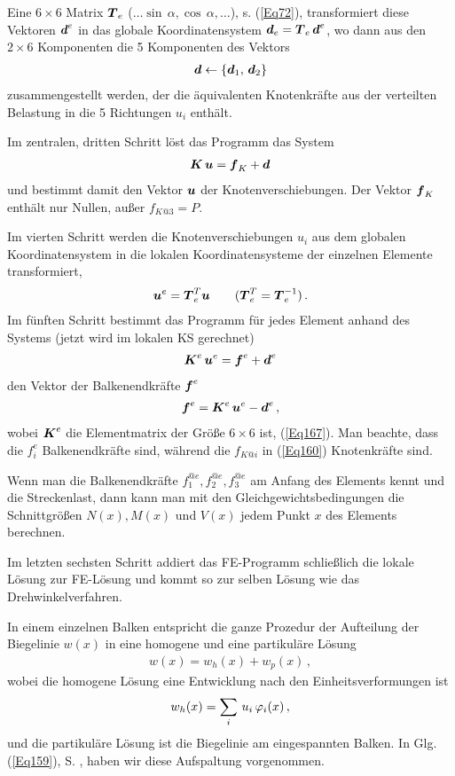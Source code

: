 Eine $6 \times 6$ Matrix $\mbox{\boldmath $T$}_e$ ($\ldots \sin\,\alpha, \cos\,\alpha, \ldots$), s. (\ref{Eq72}), transformiert diese Vektoren $\mbox{\boldmath $d$}^e$ in das globale Koordinatensystem $\mbox{\boldmath $d$}_e = \mbox{\boldmath $T$}_e\,\mbox{\boldmath $d$}^e$, wo dann aus den $2 \times 6$ Komponenten die 5 Komponenten des Vektors
\begin{align}
\mbox{\boldmath $d$}\leftarrow \{\mbox{\boldmath $d$}_1,\, \mbox{\boldmath $d$}_2\}
\end{align}
zusammengestellt werden, der die \"{a}quivalenten Knotenkr\"{a}fte aus der verteilten Belastung in die 5 Richtungen $u_i$ enth\"{a}lt.

Im zentralen, dritten Schritt l\"{o}st das Programm das System
\begin{align}\label{Eq160}
\mbox{\boldmath $K$}\,\mbox{\boldmath $u$} = \mbox{\boldmath $f$}_K + \mbox{\boldmath $d$}
\end{align}
und bestimmt damit den Vektor $\mbox{\boldmath $u$}$ der Knotenverschiebungen. Der Vektor $\mbox{\boldmath $f$}_K$ enth\"{a}lt nur Nullen, au{\ss}er $f_{K @3} = P$.

Im vierten Schritt werden die Knotenverschiebungen $u_i$ aus dem globalen Koordinatensystem in die lokalen Koordinatensysteme der einzelnen Elemente transformiert,
\begin{align}
\mbox{\boldmath $u$}^e = \mbox{\boldmath $T$}_e^T \mbox{\boldmath $u$} \qquad (\mbox{\boldmath $T$}_e^T = \mbox{\boldmath $T$}_e^{-1})\,.
\end{align}
Im f\"{u}nften Schritt bestimmt das Programm f\"{u}r jedes Element anhand des Systems (jetzt wird im lokalen KS gerechnet)
\begin{align}
\mbox{\boldmath $K$}^e\,\mbox{\boldmath $u$}^e = \mbox{\boldmath $f$}^e + \mbox{\boldmath $d$}^e
\end{align}
den Vektor der Balkenendkr\"{a}fte $\mbox{\boldmath $f$}^e$
\begin{align}
\mbox{\boldmath $f$}^e = \mbox{\boldmath $K$}^e\,\mbox{\boldmath $u$}^e - \mbox{\boldmath $d$}^e\,,
\end{align}
wobei $\mbox{\boldmath $K$}^e$ die Elementmatrix der Gr\"{o}{\ss}e $6 \times 6$ ist, (\ref{Eq167}). Man beachte, dass die $f_i^e$ Balkenendkr\"{a}fte sind, w\"{a}hrend die $f_{K @i}$ in (\ref{Eq160}) Knotenkr\"{a}fte sind.

Wenn man die Balkenendkr\"{a}fte $f_1^{@e}, f_2^{@e}, f_3^{@e}$ am Anfang des Elements kennt und die Streckenlast, dann kann man mit den Gleichgewichtsbedingungen die Schnittgr\"{o}{\ss}en $N(x), M(x)$ und $V(x)$ jedem Punkt $x$ des Elements berechnen.

Im letzten sechsten Schritt addiert das FE-Programm schlie{\ss}lich die lokale L\"{o}sung zur FE-L\"{o}sung und kommt so zur selben L\"{o}sung wie das Drehwinkelverfahren.

In einem einzelnen Balken entspricht die ganze Prozedur der Aufteilung der Biegelinie $w(x)$ in eine homogene und eine partikul\"{a}re L\"{o}sung
\begin{align}
w(x) = w_h(x) + w_p(x)\,,
\end{align}
wobei die homogene L\"{o}sung eine Entwicklung nach den Einheitsverformungen ist
\begin{align}
w_h(x) = \sum_i\,u_i\,\varphi_i(x)\,,
\end{align}
und die partikul\"{a}re L\"{o}sung ist die Biegelinie am eingespannten Balken.
In Glg. (\ref{Eq159}), S. \pageref{Eq159}, haben wir diese Aufspaltung vorgenommen.

